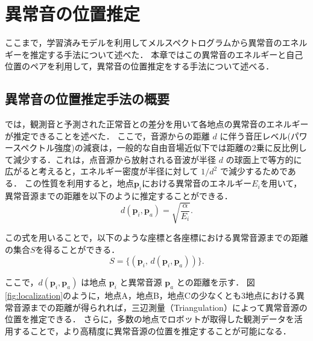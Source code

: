 \documentclass[../main]{subfiles}
\begin{document}
\section{異常音の位置推定}
\label{sec:pmethod_abnormal_detection}
ここまで，学習済みモデルを利用してメルスペクトログラムから異常音のエネルギーを推定する手法について述べた．
本章ではこの異常音のエネルギーと自己位置のペアを利用して，異常音の位置推定をする手法について述べる．

\subsection{異常音の位置推定手法の概要}
では，観測音と予測された正常音との差分を用いて各地点の異常音のエネルギーが推定できることを述べた．
ここで，音源からの距離 $d$ に伴う音圧レベル(パワースペクトル強度)の減衰は，一般的な自由音場近似下では距離の2乗に反比例して減少する．これは，点音源から放射される音波が半径 $d$ の球面上で等方的に広がると考えると，エネルギー密度が半径に対して $1/d^2$ で減少するためである．
この性質を利用すると，地点$\mathbf{p}_i$における異常音のエネルギー$E_i$を用いて，異常音源までの距離を以下のように推定することができる．
\begin{equation}
    d(\mathbf{p}_i, \mathbf{p}_a) = \sqrt{\frac{\alpha}{E_i}}.
    \label{eq:distance}
\end{equation}

この式を用いることで，以下のような座標と各座標における異常音源までの距離の集合$S$を得ることができる．
\begin{equation}
    S = \{ (\mathbf{p}_i, \, d(\mathbf{p}_i,\mathbf{p}_a)) \}.
\end{equation}

ここで，$d(\mathbf{p}_i,\mathbf{p}_a)$ は地点 $\mathbf{p}_i$ と異常音源 $\mathbf{p}_a$ との距離を示す．
図\ref{fig:localization}のように，地点A，地点B，地点Cの少なくとも3地点における異常音源までの距離が得られれば，三辺測量（Triangulation）によって異常音源の位置を推定できる．
さらに，多数の地点でロボットが取得した観測データを活用することで，より高精度に異常音源の位置を推定することが可能になる．
\end{document}
